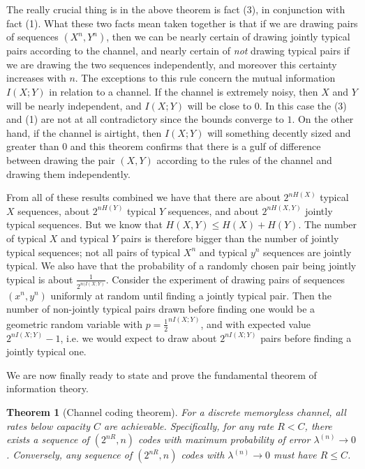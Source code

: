 \documentclass{article}
\theoremstyle{definition}
\theoremstyle{plain}
\newtheorem{theorem}{Theorem}[section]
\begin{document}
The really crucial thing is in the above theorem is fact (3), in conjunction with fact (1). What these two facts mean taken together is that if we are drawing pairs of sequences $(X^n,Y^n)$, then we can be nearly certain of drawing jointly typical pairs according to the channel, and nearly certain of \emph{not} drawing typical pairs if we are drawing the two sequences independently, and moreover this certainty increases with $n$. The exceptions to this rule concern the mutual information $I(X;Y)$ in relation to a channel. If the channel is extremely noisy, then $X$ and $Y$ will be nearly independent, and $I(X;Y)$ will be close to $0$. In this case the (3) and (1) are not at all contradictory since the bounds converge to $1$. On the other hand, if the channel is airtight, then $I(X;Y)$ will something decently sized and greater than $0$ and this theorem confirms that there is a gulf of difference between drawing the pair $(X,Y)$ according to the rules of the channel and drawing them independently. \par 
From all of these results combined we have that there are about $2^{nH(X)}$ typical $X$ sequences, about $2^{nH(Y)}$ typical $Y$ sequences, and about $2^{nH(X,Y)}$ jointly typical sequences. But we know that $H(X,Y) \leq H(X) + H(Y)$. The number of typical $X$ and typical $Y$ pairs is therefore bigger than the number of jointly typical sequences; not all pairs of typical $X^n$ and typical $y^n$ sequences are jointly typical. We also have that the probability of a randomly chosen pair being jointly typical is about $\frac{1}{2^{n(I(X;Y)}}$. Consider the experiment of drawing pairs of sequences $(x^n,y^n)$ uniformly at random until finding a jointly typical pair. Then the number of non-jointly typical pairs drawn before finding one would be a geometric random variable with $p = \frac{1}{2}^{nI(X;Y)}$, and with expected value $2^{nI(X;Y)}-1$, i.e. we would expect to draw about $2^{nI(X;Y)}$ pairs before finding a jointly typical one. \par 
We are now finally ready to state and prove the fundamental theorem of information theory.
\begin{theorem}[Channel coding theorem]
	For a discrete memoryless channel, all rates below capacity $C$ are achievable. Specifically, for any rate $R < C$, there exists a sequence of $(2^{nR},n)$ codes with maximum probability of error $\lambda^{(n)} \to 0$. Conversely, any sequence of $(2^{nR},n)$ codes with $\lambda^{(n)} \to 0$ must have $R \leq C$.  
\end{theorem}
\end{document}

